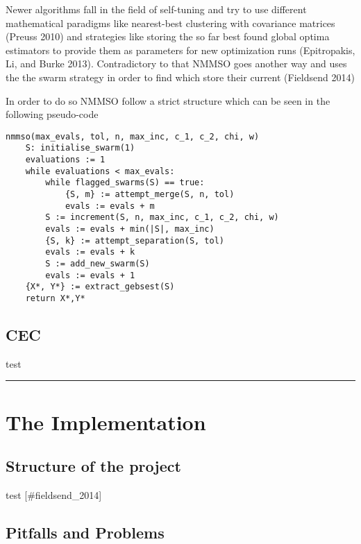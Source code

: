 \documentclass[12pt,a4paper]{article}
\begin{document}
Newer algorithms fall in the field of self-tuning and try to use
different mathematical paradigms like nearest-best clustering with
covariance matrices (Preuss 2010) and strategies like storing the so far
best found global optima estimators to provide them as parameters for
new optimization runs (Epitropakis, Li, and Burke 2013). Contradictory
to that NMMSO goes another way and uses the the swarm strategy in order
to find which store their current (Fieldsend 2014)

In order to do so NMMSO follow a strict structure which can be seen in
the following pseudo-code

\begin{verbatim}
nmmso(max_evals, tol, n, max_inc, c_1, c_2, chi, w)
    S: initialise_swarm(1)
    evaluations := 1
    while evaluations < max_evals:
        while flagged_swarms(S) == true:
            {S, m} := attempt_merge(S, n, tol)
            evals := evals + m
        S := increment(S, n, max_inc, c_1, c_2, chi, w)
        evals := evals + min(|S|, max_inc)
        {S, k} := attempt_separation(S, tol)
        evals := evals + k
        S := add_new_swarm(S)
        evals := evals + 1
    {X*, Y*} := extract_gebsest(S)
    return X*,Y*
\end{verbatim}

\subsection{CEC}\label{cec}

test

\begin{center}\rule{0.5\linewidth}{\linethickness}\end{center}

\section{The Implementation}\label{the-implementation}

\subsection{Structure of the project}\label{structure-of-the-project}

test {[}\#fieldsend\_2014{]}

\subsection{Pitfalls and Problems}\label{pitfalls-and-problems}
\end{document}
